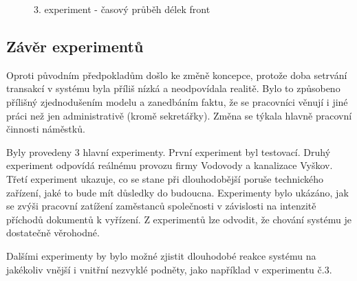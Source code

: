 \documentclass[12pt,a4paper]{article}
\begin{document}
\begin{figure}[ht]
 \begin{center}
    \caption{3. experiment - časový průběh délek front}
    \label{exp3_graf}
 \end{center}
\end{figure}


\subsection{Závěr experimentů}
Oproti původním předpokladům došlo ke změně koncepce, protože doba setrvání trans\-ak\-cí v systému byla příliš nízká a neodpovídala realitě. Bylo to způsobeno přílišný zjed\-no\-du\-še\-ním modelu a zanedbáním faktu, že se pracovníci věnují i jiné práci než jen administrativě (kromě sekretářky). Změna se týkala hlavně pracovní činnosti náměstků.

Byly provedeny 3 hlavní experimenty. První experiment byl testovací. Druhý experiment odpovídá reálnému provozu firmy Vodovody a kanalizace Vyškov. Třetí experiment ukazuje, co se stane při dlouhodobější poruše technického zařízení, jaké to bude mít důsledky do budoucna. Experimenty bylo ukázáno, jak se zvýši pracovní zatížení zaměstanců společnosti v závislosti na intenzitě příchodů dokumentů k vyřízení. Z experimentů lze odvodit, že chování systému je dostatečně věrohodné.

Dalšími experimenty by bylo možné zjistit dlouhodobé reakce systému na jakékoliv vnější i vnitřní nezvyklé podněty, jako například v experimentu č.3. 
\end{document}
